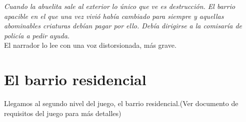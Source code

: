 \documentclass[titlepage]{article}
\begin{document}
\emph{Cuando la abuelita sale al exterior lo único que ve es destrucción. El barrio apacible en el que una vez vivió había cambiado para siempre y aquellas abominables criaturas debían pagar por ello. Debía dirigirse a la comisaría de policía a pedir ayuda.}\\

El narrador lo lee con una voz distorsionada, más grave.

\section{El barrio residencial}

Llegamos al segundo nivel del juego, el barrio residencial.(Ver documento de requisitos del juego para más detalles)
\end{document}
